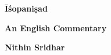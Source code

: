 \thispagestyle{empty}

\begin{center}
{\Huge\bfseries Īśopaniṣad}
\medskip

{\large\textbf{An English Commentary}}
\vfill


{\Large\textbf{Nithin Sridhar}}
\vfill
\end{center}

